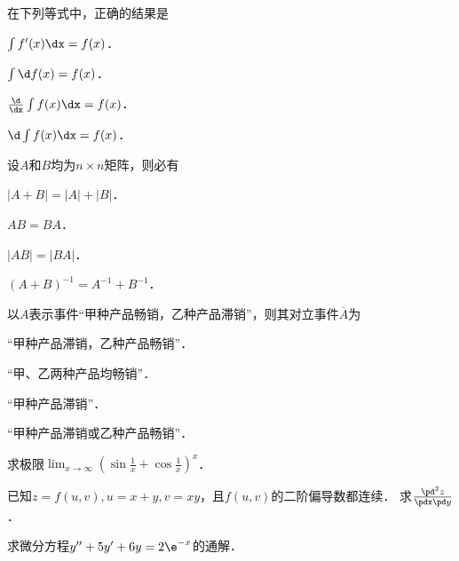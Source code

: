 \documentclass[plain,noanswer,medmath]{../../template/jnuexam}
\begin{document}
\begin{problem}
在下列等式中，正确的结果是 \pickout{}
\begin{abcd}
\item $\int f'(x)\dx=f(x)$．
\item $\int \d f(x)=f(x)$．
\item $\frac{\d}{\dx}\int f(x)\dx=f(x)$．
\item $\d\int f(x)\dx=f(x)$．
\end{abcd}
\end{problem}




\begin{problem}
设$A$和$B$均为$n\times n$矩阵，则必有 \pickout{}
\begin{abcd}
\item $|A+B|=|A|+|B|$．
\item $AB=BA$．
\item $|AB|=|BA|$．
\item $(A+B)^{-1}=A^{-1}+B^{-1}$．
\end{abcd}
\end{problem}


\begin{problem}
以$A$表示事件“甲种产品畅销，乙种产品滞销”，则其对立事件$\overline{A}$为 \pickout{}
\begin{abcd}
\item “甲种产品滞销，乙种产品畅销”．
\item “甲、乙两种产品均畅销”．
\item “甲种产品滞销”．
\item “甲种产品滞销或乙种产品畅销”．
\end{abcd}
\end{problem}



\begin{problem}
求极限$\lim_{x\to \infty}\left(\sin\frac{1}{x}+\cos\frac{1}{x}\right)^x$．
\end{problem}


\begin{problem}
已知$z=f(u,v),u=x+y,v=xy$，且$f(u,v)$的二阶偏导数都连续．
求$\frac{\pd^2 z}{\pdx\pd y}$．
\end{problem}


\begin{problem}
求微分方程$y''+5y'+6y=2\e^{-x}$的通解．
\end{problem}


\end{document}
